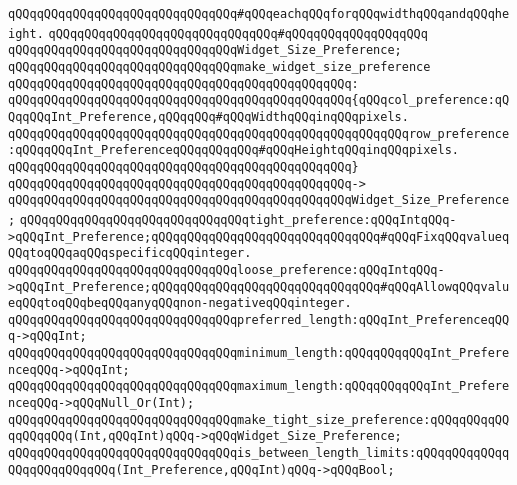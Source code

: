 \verb|qQQqqQQqqQQqqQQqqQQqqQQqqQQqqQQq#qQQqeachqQQqforqQQqwidthqQQqandqQQqheight.|\newline
\verb|qQQqqQQqqQQqqQQqqQQqqQQqqQQqqQQq#qQQqqQQqqQQqqQQqqQQq|\newline
\verb|qQQqqQQqqQQqqQQqqQQqqQQqqQQqqQQqWidget_Size_Preference;|\newline
\newline
\verb|qQQqqQQqqQQqqQQqqQQqqQQqqQQqqQQqmake_widget_size_preference|\newline
\verb|qQQqqQQqqQQqqQQqqQQqqQQqqQQqqQQqqQQqqQQqqQQqqQQq:|\newline
\verb|qQQqqQQqqQQqqQQqqQQqqQQqqQQqqQQqqQQqqQQqqQQqqQQq{qQQqcol_preference:qQQqqQQqInt_Preference,qQQqqQQq#qQQqWidthqQQqinqQQqpixels.|\newline
\verb|qQQqqQQqqQQqqQQqqQQqqQQqqQQqqQQqqQQqqQQqqQQqqQQqqQQqqQQqrow_preference:qQQqqQQqInt_PreferenceqQQqqQQqqQQq#qQQqHeightqQQqinqQQqpixels.|\newline
\verb|qQQqqQQqqQQqqQQqqQQqqQQqqQQqqQQqqQQqqQQqqQQqqQQq}|\newline
\verb|qQQqqQQqqQQqqQQqqQQqqQQqqQQqqQQqqQQqqQQqqQQqqQQq->|\newline
\verb|qQQqqQQqqQQqqQQqqQQqqQQqqQQqqQQqqQQqqQQqqQQqqQQqWidget_Size_Preference;|\newline
\newline
\verb|qQQqqQQqqQQqqQQqqQQqqQQqqQQqqQQqtight_preference:qQQqIntqQQq->qQQqInt_Preference;qQQqqQQqqQQqqQQqqQQqqQQqqQQqqQQq#qQQqFixqQQqvalueqQQqtoqQQqaqQQqspecificqQQqinteger.|\newline
\verb|qQQqqQQqqQQqqQQqqQQqqQQqqQQqqQQqloose_preference:qQQqIntqQQq->qQQqInt_Preference;qQQqqQQqqQQqqQQqqQQqqQQqqQQqqQQq#qQQqAllowqQQqvalueqQQqtoqQQqbeqQQqanyqQQqnon-negativeqQQqinteger.|\newline
\newline
\verb|qQQqqQQqqQQqqQQqqQQqqQQqqQQqqQQqpreferred_length:qQQqInt_PreferenceqQQq->qQQqInt;|\newline
\verb|qQQqqQQqqQQqqQQqqQQqqQQqqQQqqQQqminimum_length:qQQqqQQqqQQqInt_PreferenceqQQq->qQQqInt;|\newline
\verb|qQQqqQQqqQQqqQQqqQQqqQQqqQQqqQQqmaximum_length:qQQqqQQqqQQqInt_PreferenceqQQq->qQQqNull_Or(Int);|\newline
\newline
\verb|qQQqqQQqqQQqqQQqqQQqqQQqqQQqqQQqmake_tight_size_preference:qQQqqQQqqQQqqQQqqQQq(Int,qQQqInt)qQQq->qQQqWidget_Size_Preference;|\newline
\verb|qQQqqQQqqQQqqQQqqQQqqQQqqQQqqQQqis_between_length_limits:qQQqqQQqqQQqqQQqqQQqqQQqqQQq(Int_Preference,qQQqInt)qQQq->qQQqBool;|\newline
